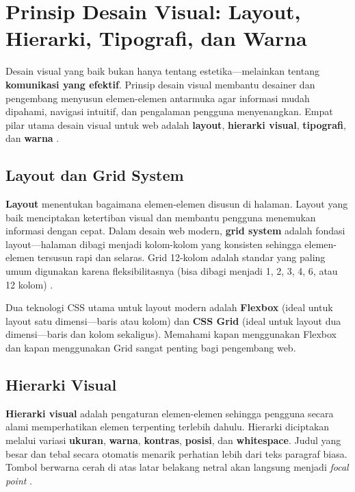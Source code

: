 ﻿\section{Prinsip Desain Visual: Layout, Hierarki, Tipografi, dan Warna}

Desain visual yang baik bukan hanya tentang estetika---melainkan tentang \textbf{komunikasi yang efektif}. Prinsip desain visual membantu desainer dan pengembang menyusun elemen-elemen antarmuka agar informasi mudah dipahami, navigasi intuitif, dan pengalaman pengguna menyenangkan. Empat pilar utama desain visual untuk web adalah \textbf{layout}, \textbf{hierarki visual}, \textbf{tipografi}, dan \textbf{warna} \cite{mdnCss}.

\subsection{Layout dan Grid System}

\textbf{Layout} menentukan bagaimana elemen-elemen disusun di halaman. Layout yang baik menciptakan ketertiban visual dan membantu pengguna menemukan informasi dengan cepat. Dalam desain web modern, \textbf{grid system} adalah fondasi layout---halaman dibagi menjadi kolom-kolom yang konsisten sehingga elemen-elemen tersusun rapi dan selaras. Grid 12-kolom adalah standar yang paling umum digunakan karena fleksibilitasnya (bisa dibagi menjadi 1, 2, 3, 4, 6, atau 12 kolom) \cite{webdevLearn}.

Dua teknologi CSS utama untuk layout modern adalah \textbf{Flexbox} (ideal untuk layout satu dimensi---baris atau kolom) dan \textbf{CSS Grid} (ideal untuk layout dua dimensi---baris dan kolom sekaligus). Memahami kapan menggunakan Flexbox dan kapan menggunakan Grid sangat penting bagi pengembang web.

\subsection{Hierarki Visual}

\textbf{Hierarki visual} adalah pengaturan elemen-elemen sehingga pengguna secara alami memperhatikan elemen terpenting terlebih dahulu. Hierarki diciptakan melalui variasi \textbf{ukuran}, \textbf{warna}, \textbf{kontras}, \textbf{posisi}, dan \textbf{whitespace}. Judul yang besar dan tebal secara otomatis menarik perhatian lebih dari teks paragraf biasa. Tombol berwarna cerah di atas latar belakang netral akan langsung menjadi \textit{focal point} \cite{mdnCss}.

